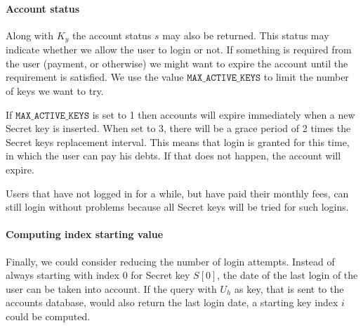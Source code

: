 \paragraph{Account status}
Along with $K_y$ the account status $s$ may also be returned.
This status may indicate whether we allow the user to login or not.
If something is required from the user
(payment, or otherwise)
we might want to expire the account until the requirement is satisfied.
We use the value $\mathtt{MAX\_ACTIVE\_KEYS}$ to limit the number of keys we want to try.
\par
If $\mathtt{MAX\_ACTIVE\_KEYS}$ is set to 1 then accounts will expire immediately when a new Secret key is inserted.
When set to 3,
there will be a grace period of 2 times the Secret keys replacement interval.
This means that login is granted for this time,
in which the user can pay his debts.
If that does not happen,
the account will expire.
\par
Users that have not logged in for a while,
but have paid their monthly fees,
can still login without problems because all Secret keys will be tried for such logins.
\paragraph{Computing index starting value}
Finally, we could consider reducing the number of login attempts.
Instead of always starting with index $0$ for Secret key $S[0]$,
the date of the last login of the user can be taken into account.
If the query with $U_h$ as key,
that is sent to the accounts database,
would also return the last login date,
a starting key index $i$ could be computed.

